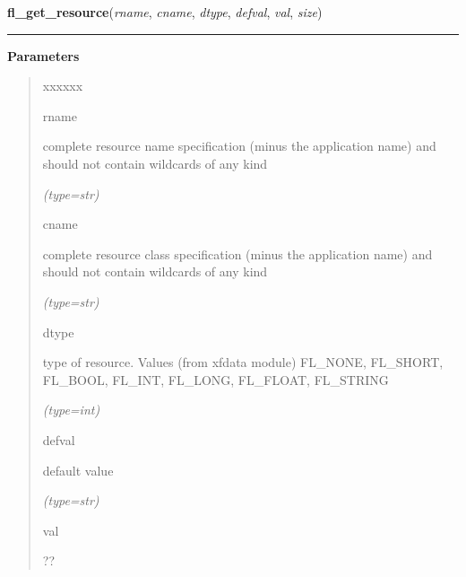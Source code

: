     \label{xformslib:flxbasic:fl_get_resource}

    \vspace{0.5ex}

\hspace{.8\funcindent}\begin{boxedminipage}{\funcwidth}

    \raggedright \textbf{fl\_get\_resource}(\textit{rname}, \textit{cname}, \textit{dtype}, \textit{defval}, \textit{val}, \textit{size})

    \vspace{-1.5ex}

    \rule{\textwidth}{0.5\fboxrule}
\setlength{\parskip}{2ex}
\setlength{\parskip}{1ex}
      \textbf{Parameters}
      \vspace{-1ex}

      \begin{quote}
        \begin{Ventry}{xxxxxx}

          \item[rname]

          complete resource name specification (minus the application name)
          and should not contain wildcards of any kind

            {\it (type=str)}

          \item[cname]

          complete resource class specification (minus the application 
          name) and should not contain wildcards of any kind

            {\it (type=str)}

          \item[dtype]

          type of resource. Values (from xfdata module) FL\_NONE, 
          FL\_SHORT, FL\_BOOL, FL\_INT, FL\_LONG, FL\_FLOAT, FL\_STRING

            {\it (type=int)}

          \item[defval]

          default value

            {\it (type=str)}

          \item[val]

          ??


\end{Ventry}
\end{quote}
\end{boxedminipage}
